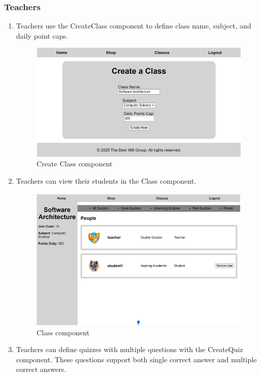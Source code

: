 \subsubsection{Teachers}
\begin{enumerate}
    \item Teachers use the CreateClass component to define class name, subject, and daily point caps.
    \begin{figure}[h]
        \centering
        \includegraphics[width=0.7\linewidth]{PUT INDIVIDUAL SECTIONS HERE/images/createClass.png}
        \caption{Create Class component}
        \label{fig:enter-label}
    \end{figure}
        \item Teachers can view their students in the Class component.
    \begin{figure}[H]
        \centering
        \includegraphics[width=0.7\linewidth]{PUT INDIVIDUAL SECTIONS HERE/images/classOverview.png}
        \caption{Class component}
        \label{class-overview}
    \end{figure}
        \item Teachers can define quizzes with multiple questions with the CreateQuiz component. These questions support both single correct answer and multiple correct answers.
    \begin{figure}[H]
        \centering

\end{figure}
\end{enumerate}
